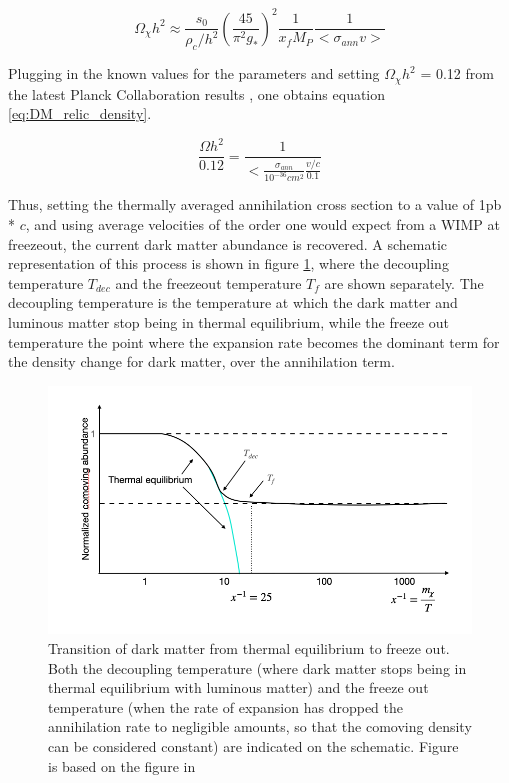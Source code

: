 \begin{equation}
    \label{eq:sol_Boltzmann}
    \Omega_\chi h^2 \approx \frac{s_0}{\rho_c/h^2} \left( \frac{45}{\pi^2g_*}\right)^2 \frac{1}{x_f M_P} \frac{1}{<\sigma_{ann}v>}
\end{equation}

Plugging in the known values for the parameters\cite{ref 533 DM review} and setting $\Omega_\chi h^2$ = 0.12 from the latest Planck Collaboration results \cite{Planck2018}, one obtains equation \ref{eq:DM_relic_density}. 

\begin{equation}
    \label{eq:DM_relic_density}
    \frac{\Omega h^2}{0.12} = \frac{1}{<\frac{\sigma_{ann}}{10^{-36} cm^2} \frac{v/c}{0.1}}
\end{equation}

Thus, setting the thermally averaged annihilation cross section to a value of 1pb * $c$, and using average velocities of the order one would expect from a WIMP at freezeout, the current dark matter abundance is recovered. A schematic representation of this process is shown in figure \ref{fig:DM_thremal_eq_freeze_out}, where the decoupling temperature $T_{dec}$ and the freezeout temperature $T_{f}$ are shown separately. The decoupling temperature is the temperature at which the dark matter and luminous matter stop being in thermal equilibrium, while the freeze out temperature the point where the expansion rate becomes the dominant term for the density change for dark matter, over the annihilation term. 

\begin{figure}[htbp]
    \centering
    \includegraphics[width=\textwidth]{figures/schematic_thermal_eq_evolution_DM.png}
    \caption{Transition of dark matter from thermal equilibrium to freeze out. Both the decoupling temperature (where dark matter stops being in thermal equilibrium with luminous matter) and the freeze out temperature (when the rate of expansion has dropped the annihilation rate to negligible amounts, so that the comoving density can be considered constant) are indicated on the schematic. Figure is based on the figure in \cite{Baer}}
    \label{fig:DM_thremal_eq_freeze_out}
\end{figure}



